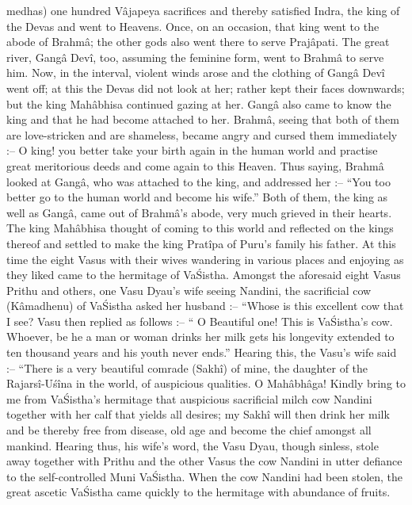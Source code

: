 medhas) one hundred V\^ajapeya sacrifices and thereby satisfied Indra, the king of the Devas and went to Heavens. Once, on an occasion, that king went to the abode of Brahm\^a; the other gods also went there to serve Praj\^apati. The great river, Gang\^a Dev\^i, too, assuming the feminine form, went to Brahm\^a to serve him. Now, in the interval, violent winds arose and the clothing of Gang\^a Dev\^i went off; at this the Devas did not look at her; rather kept their faces downwards; but the king Mah\^abhisa continued gazing at her. Gang\^a also came to know the king and that he had become attached to her. Brahm\^a, seeing that both of them are love-stricken and are shameless, became angry and cursed them immediately :-- O king! you better take your birth again in the human world and practise great meritorious deeds and come again to this Heaven. Thus saying, Brahm\^a looked at Gang\^a, who was attached to the king, and addressed her :-- ``You too better go to the human world and become his wife.'' Both of them, the king as well as Gang\^a, came out of Brahm\^a's abode, very much grieved in their hearts. The king Mah\^abhisa thought of coming to this world and reflected on the kings thereof and settled to make the king Prat\^ipa of Puru's family his father. At this time the eight Vasus with their wives wandering in various places and enjoying as they liked came to the hermitage of Va\'Sistha. Amongst the aforesaid eight Vasus Prithu and others, one Vasu Dyau's wife seeing Nandini, the sacrificial cow (K\^amadhenu) of Va\'Sistha asked her husband :-- ``Whose is this excellent cow that I see?  Vasu then replied as follows :-- `` O Beautiful one! This is Va\'Sistha's cow. Whoever, be he a man or woman drinks her milk gets his longevity extended to ten thousand years and his youth never ends.'' Hearing this, the Vasu's wife said :-- ``There is a very beautiful comrade (Sakh\^i) of mine, the daughter of the Rajars\^i-U\'s\^ina in the world, of auspicious qualities. O Mah\^abh\^aga! Kindly bring to me from Va\'Sistha's hermitage that auspicious sacrificial milch cow Nandini together with her calf that yields all desires; my Sakh\^i will then drink her milk and be thereby free from disease, old age and become the chief amongst all mankind. Hearing thus, his wife's word, the Vasu Dyau, though sinless, stole away together with Prithu and the other Vasus the cow Nandini in utter defiance to the self-controlled Muni Va\'Sistha. When the cow Nandini had been stolen, the great ascetic Va\'Sistha came quickly to the hermitage with abundance of fruits.

